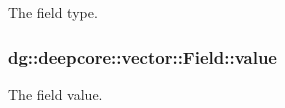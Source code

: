 The field type. 

\subsubsection[{\texorpdfstring{value}{value}}]{ dg\+::deepcore\+::vector\+::\+Field\+::value}\hypertarget{structdg_1_1deepcore_1_1vector_1_1_field_a236f34fb91447d2c807943a28ebcd119}{}\label{structdg_1_1deepcore_1_1vector_1_1_field_a236f34fb91447d2c807943a28ebcd119}


The field value. 

